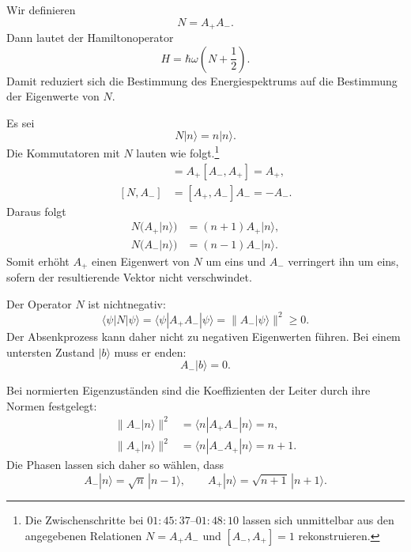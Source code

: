 Wir definieren
\begin{equation}
N=A_+A_-.
\end{equation}
Dann lautet der Hamiltonoperator
\begin{equation}
H=\hbar\omega\left(N+\frac{1}{2}\right).
\end{equation}
Damit reduziert sich die Bestimmung des Energiespektrums auf die Bestimmung der Eigenwerte von \(N\).

Es sei
\begin{equation}
N|n\rangle=n|n\rangle.
\end{equation}
Die Kommutatoren mit \(N\) lauten wie folgt.\footnote{Die Zwischenschritte bei \(01{:}45{:}37\)--\(01{:}48{:}10\) lassen sich unmittelbar aus den angegebenen Relationen \(N=A_+A_-\) und \([A_-,A_+]=1\) rekonstruieren.}
\begin{align}
[N,A_+]
&=A_+[A_-,A_+]=A_+, \\
[N,A_-]
&=[A_+,A_-]A_-=-A_-.
\end{align}
Daraus folgt
\begin{align}
N\bigl(A_+|n\rangle\bigr)
&=(n+1)A_+|n\rangle, \\
N\bigl(A_-|n\rangle\bigr)
&=(n-1)A_-|n\rangle.
\end{align}
Somit erhöht \(A_+\) einen Eigenwert von \(N\) um eins und \(A_-\) verringert ihn um eins, sofern der resultierende Vektor nicht verschwindet.

Der Operator \(N\) ist nichtnegativ:
\begin{equation}
\langle\psi|N|\psi\rangle
=\langle\psi|A_+A_-|\psi\rangle
=\|A_-|\psi\rangle\|^2
\geq0.
\end{equation}
Der Absenkprozess kann daher nicht zu negativen Eigenwerten führen. Bei einem untersten Zustand \(|b\rangle\) muss er enden:
\begin{equation}
A_-|b\rangle=0.
\end{equation}

Bei normierten Eigenzuständen sind die Koeffizienten der Leiter durch ihre Normen festgelegt:
\begin{align}
\|A_-|n\rangle\|^2
&=\langle n|A_+A_-|n\rangle=n, \\
\|A_+|n\rangle\|^2
&=\langle n|A_-A_+|n\rangle=n+1.
\end{align}
Die Phasen lassen sich daher so wählen, dass
\begin{equation}
A_-|n\rangle=\sqrt{n}\,|n-1\rangle,
\qquad
A_+|n\rangle=\sqrt{n+1}\,|n+1\rangle.
\end{equation}

